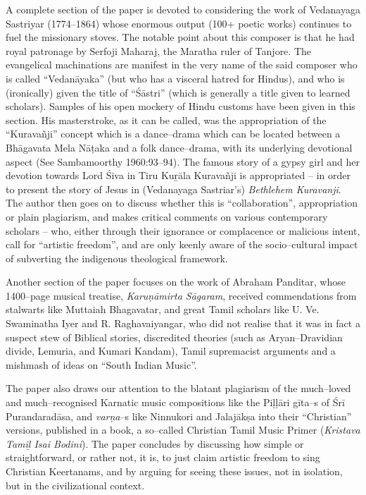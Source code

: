 A complete section of the paper is devoted to considering the work of Vedanayaga Sastriyar (1774–1864) whose enormous output (100+ poetic works) continues to fuel the missionary stoves. The notable point about this composer is that he had royal patronage by Serfoji Maharaj, the Maratha ruler of Tanjore. The evangelical machinations are manifest in the very name of the said composer who is called “Vedanāyaka” (but who has a visceral hatred for Hindus), and who is (ironically) given the title of “Śāstri” (which is generally a title given to learned scholars). Samples of his open mockery of Hindu customs have been given in this section. His masterstroke, as it can be called, was the appropriation of the “Kuravañji” concept which is a dance–drama which can be located between a Bhāgavata Mela Nāṭaka and a folk dance–drama, with its underlying devotional aspect (See Sambamoorthy 1960:93–94). The famous story of a gypsy girl and her devotion towards Lord Śiva in Tiru Kuṟāla Kuravañji is appropriated – in order to present the story of Jesus in (Vedanayaga Sastriar’s) \textit{Bethlehem Kuravanji}. The author then goes on to discuss whether this is “collaboration”, appropriation or plain plagiarism, and makes critical comments on various contemporary scholars – who, either through their ignorance or complacence or malicious intent, call for “artistic freedom”, and are only keenly aware of the socio–cultural impact of subverting the indigenous theological framework.

Another section of the paper focuses on the work of Abraham Panditar, whose 1400–page musical treatise, \textit{Karuṇāmirta Sāgaram}, received commendations from stalwarts like Muttaiah Bhagavatar, and great Tamil scholars like U. Ve. Swaminatha Iyer and R. Raghavaiyangar, who did not realise that it was in fact a suspect stew of Biblical stories, discredited theories (such as Aryan–Dravidian divide, Lemuria, and Kumari Kandam), Tamil supremacist arguments and a mishmash of ideas on “South Indian Music”.

The paper also draws our attention to the blatant plagiarism of the much–loved and much–recognised Karnatic music compositions like the Piḷḷāri gīta–s of Śrī Purandaradāsa, and \textit{varṇa}–s like Ninnukori and Jalajākṣa into their “Christian” versions, published in a book, a so–called Christian Tamil Music Primer (\textit{Kristava Tamiḻ Isai Bodini}). The paper concludes by discussing how simple or straightforward, or rather not, it is, to just claim artistic freedom to sing Christian Keertanams, and by arguing for seeing these issues, not in isolation, but in the civilizational context.

